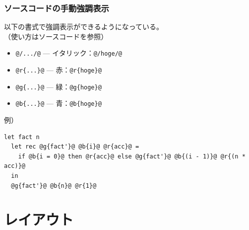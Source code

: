 \documentclass[dvipdfmx,cjk,xcolor=dvipsnames,envcountsect,notheorems,12pt]{beamer}
\theoremstyle{definition}
\begin{document}
\begin{frame}[fragile]%
  \frametitle{ソースコードの手動強調表示}
  以下の書式で強調表示ができるようになっている。\\
  （使い方はソースコードを参照）
  \begin{itemize}
  \item \verb|@/.../@| --- イタリック：\lstinline|@/hoge/@|
  \item \verb|@r{...}@| --- 赤：\lstinline|@r{hoge}@|
  \item \verb|@g{...}@| --- 緑：\lstinline|@g{hoge}@|
  \item \verb|@b{...}@| --- 青：\lstinline|@b{hoge}@|
  \end{itemize}
  \vfill
  例）
\begin{lstlisting}
let fact n
  let rec @g{fact'}@ @b{i}@ @r{acc}@ =
    if @b{i = 0}@ then @r{acc}@ else @g{fact'}@ @b{(i - 1)}@ @r{(n * acc)}@
  in
  @g{fact'}@ @b{n}@ @r{1}@
\end{lstlisting}
\end{frame}

\section{レイアウト}
\end{document}

